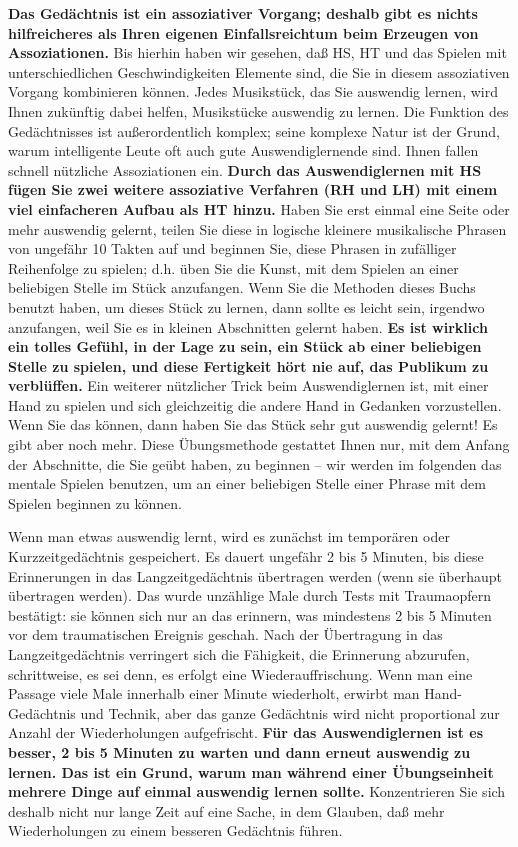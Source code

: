 \textbf{Das Gedächtnis ist ein assoziativer Vorgang; deshalb gibt es nichts hilfreicheres als Ihren eigenen Einfallsreichtum beim Erzeugen von Assoziationen.}
Bis hierhin haben wir gesehen, daß HS, HT und das Spielen mit unterschiedlichen Geschwindigkeiten Elemente sind, die Sie in diesem assoziativen Vorgang kombinieren können.
Jedes Musikstück, das Sie auswendig lernen, wird Ihnen zukünftig dabei helfen, Musikstücke auswendig zu lernen.
Die Funktion des Gedächtnisses ist außerordentlich komplex; seine komplexe Natur ist der Grund, warum intelligente Leute oft auch gute Auswendiglernende sind.
Ihnen fallen schnell nützliche Assoziationen ein.
\textbf{Durch das Auswendiglernen mit HS fügen Sie zwei weitere assoziative Verfahren (RH und LH) mit einem viel einfacheren Aufbau als HT hinzu.}
Haben Sie erst einmal eine Seite oder mehr auswendig gelernt, teilen Sie diese in logische kleinere musikalische Phrasen von ungefähr 10 Takten auf und beginnen Sie, diese Phrasen in zufälliger Reihenfolge zu spielen; d.h. üben Sie die Kunst, mit dem Spielen an einer beliebigen Stelle im Stück anzufangen.
Wenn Sie die Methoden dieses Buchs benutzt haben, um dieses Stück zu lernen, dann sollte es leicht sein, irgendwo anzufangen, weil Sie es in kleinen Abschnitten gelernt haben.
\textbf{Es ist wirklich ein tolles Gefühl, in der Lage zu sein, ein Stück ab einer beliebigen Stelle zu spielen, und diese Fertigkeit hört nie auf, das Publikum zu verblüffen.}
Ein weiterer nützlicher Trick beim Auswendiglernen ist, mit einer Hand zu spielen und sich gleichzeitig die andere Hand in Gedanken vorzustellen.
Wenn Sie das können, dann haben Sie das Stück sehr gut auswendig gelernt!
Es gibt aber noch mehr.
Diese Übungsmethode gestattet Ihnen nur, mit dem Anfang der Abschnitte, die Sie geübt haben, zu beginnen -- wir werden im folgenden das mentale Spielen benutzen, um an einer beliebigen Stelle einer Phrase mit dem Spielen beginnen zu können.

Wenn man etwas auswendig lernt, wird es zunächst im temporären oder Kurzzeitgedächtnis gespeichert.
Es dauert ungefähr 2 bis 5 Minuten, bis diese Erinnerungen in das Langzeitgedächtnis übertragen werden (wenn sie überhaupt übertragen werden).
Das wurde unzählige Male durch Tests mit Traumaopfern bestätigt: sie können sich nur an das erinnern, was mindestens 2 bis 5 Minuten vor dem traumatischen Ereignis geschah.
Nach der Übertragung in das Langzeitgedächtnis verringert sich die Fähigkeit, die Erinnerung abzurufen, schrittweise, es sei denn, es erfolgt eine Wiederauffrischung.
Wenn man eine Passage viele Male innerhalb einer Minute wiederholt, erwirbt man Hand-Gedächtnis und Technik, aber das ganze Gedächtnis wird nicht proportional zur Anzahl der Wiederholungen aufgefrischt.
\textbf{Für das Auswendiglernen ist es besser, 2 bis 5 Minuten zu warten und dann erneut auswendig zu lernen.
Das ist ein Grund, warum man während einer Übungseinheit mehrere Dinge auf einmal auswendig lernen sollte.}
Konzentrieren Sie sich deshalb nicht nur lange Zeit auf eine Sache, in dem Glauben, daß mehr Wiederholungen zu einem besseren Gedächtnis führen.
 
